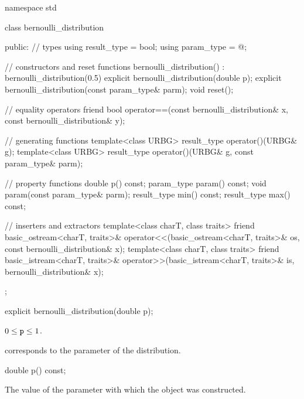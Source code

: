 %
%
\begin{codeblock}
namespace std {
  class bernoulli_distribution {
  public:
    // types
    using result_type = bool;
    using param_type  = @\unspec@;

    // constructors and reset functions
    bernoulli_distribution() : bernoulli_distribution(0.5) {}
    explicit bernoulli_distribution(double p);
    explicit bernoulli_distribution(const param_type& parm);
    void reset();

    // equality operators
    friend bool operator==(const bernoulli_distribution& x, const bernoulli_distribution& y);

    // generating functions
    template<class URBG>
      result_type operator()(URBG& g);
    template<class URBG>
      result_type operator()(URBG& g, const param_type& parm);

    // property functions
    double p() const;
    param_type param() const;
    void param(const param_type& parm);
    result_type min() const;
    result_type max() const;

    // inserters and extractors
    template<class charT, class traits>
      friend basic_ostream<charT, traits>&
        operator<<(basic_ostream<charT, traits>& os, const bernoulli_distribution& x);
    template<class charT, class traits>
      friend basic_istream<charT, traits>&
        operator>>(basic_istream<charT, traits>& is, bernoulli_distribution& x);
  };
}
\end{codeblock}


%
\begin{itemdecl}
explicit bernoulli_distribution(double p);
\end{itemdecl}

\begin{itemdescr}
\pnum
\expects
$0 \leq \tcode{p} \leq 1$.

\pnum
\remarks
 corresponds to the parameter of the distribution.
\end{itemdescr}

%
\begin{itemdecl}
double p() const;
\end{itemdecl}

\begin{itemdescr}
\pnum
\returns
The value of the  parameter
 with which the object was constructed.
\end{itemdescr}

